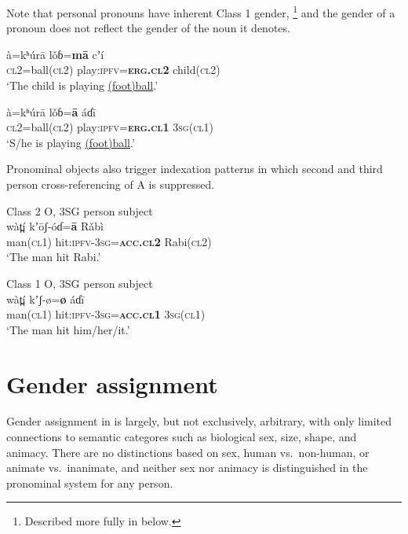 \documentclass[output=collectionpaper,hidelinks]{langscibook}
\theoremstyle{remark}
\begin{document}
Note that personal pronouns have inherent Class 1 gender,%
\footnote{Described more fully in  below.} %
and the gender of a pronoun does not reflect the gender of the noun it denotes.

\ea
\gll  à=kʰúrā lǒɓ=\textbf{mā} cʼí \\
 \textsc{cl2}=ball(\textsc{cl2}) play:\textsc{ipfv}=\textbf{\textsc{erg.cl2}} child(\textsc{cl2}) \\
\glt `The child is playing \uline{(foot)ball}.' \\
\z

\ea
\gll  à=kʰúrā lǒɓ=\textbf{ā} áɗī \\
 \textsc{cl2}=ball(\textsc{cl2}) play:\textsc{ipfv}=\textbf{\textsc{erg.cl1}} \textsc{3sg}(\textsc{cl1}) \\
\glt `S/he is playing \uline{(foot)ball}.' \\
\z


Pronominal objects also trigger indexation patterns in which second and third person
cross-referencing of A is suppressed.

\ea
 Class 2 O, 3SG person subject \\
\gll wàt̪í kʼōʃ-óɗ=\textbf{ā} Rǎbì \\
 man(\textsc{cl1}) hit:\textsc{ipfv}-\textsc{3sg}=\textbf{\textsc{acc.cl2}} Rabi(\textsc{cl2}) \\
\glt `The man hit Rabi.' \\
\z

\ea
 Class 1 O, 3SG person subject \\
\gll wàt̪í kʼ\oMidHigh{}\hspace*{-0.4mm}ʃ-ø=\textbf{ø} áɗī \\
 man(\textsc{cl1}) hit:\textsc{ipfv}-\textsc{3sg}=\textbf{\textsc{acc.cl1}} \textsc{3sg}(\textsc{cl1}) \\
\glt `The man hit him/her/it.' \\
\z


\section{Gender assignment}
\label{sec:Assignment}

Gender assignment in  is largely, but not exclusively, arbitrary, with only
limited connections to semantic categores such as biological sex, size, shape,
and animacy. There are no distinctions based on sex, human vs.\ non-human, or
animate vs.\ inanimate, and neither sex nor animacy is distinguished in the
pronominal system for any person.
\end{document}
